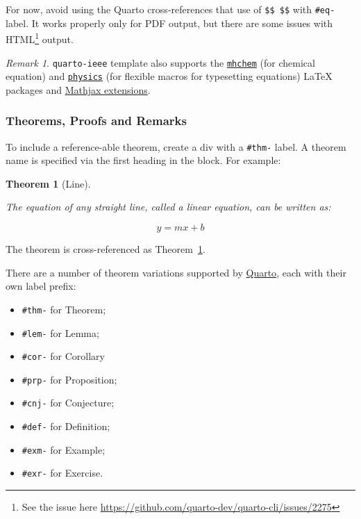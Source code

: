 \documentclass[
  journal,
]{IEEEtran}%
\providecommand{\tightlist}{%
  \setlength{\itemsep}{0pt}\setlength{\parskip}{0pt}}\usepackage{longtable,booktabs,array}
\theoremstyle{plain}
\newtheorem{theorem}{Theorem}[section]
\theoremstyle{remark}
\newtheorem*{remark}{Remark}
\begin{document}
For now, avoid using the Quarto cross-references that use of
\texttt{\$\$\ \$\$} with \texttt{\#eq-} label. It works properly only
for PDF output, but there are some issues with HTML\footnote{See the
  issue here \url{https://github.com/quarto-dev/quarto-cli/issues/2275}}
output.

\begin{remark}

\texttt{quarto-ieee} template also supports the
\href{https://ctan.org/pkg/mhchem}{\texttt{mhchem}} (for chemical
equation) and \href{https://ctan.org/pkg/physics}{\texttt{physics}} (for
flexible macros for typesetting equations) {\LaTeX} packages and
\href{https://docs.mathjax.org/en/latest/input/tex/extensions/index.html}{Mathjax
extensions}.

\end{remark}

\hypertarget{theorems-proofs-and-remarks}{%
\subsubsection{Theorems, Proofs and
Remarks}\label{theorems-proofs-and-remarks}}

To include a reference-able theorem, create a div with a \texttt{\#thm-}
label. A theorem name is specified via the first heading in the block.
For example:

\begin{theorem}[Line]\protect\hypertarget{thm-line}{}\label{thm-line}

The equation of any straight line, called a linear equation, can be
written as:

\[
y = mx + b
\]

\end{theorem}

The theorem is cross-referenced as Theorem~\ref{thm-line}.

There are a number of theorem variations supported by
\href{https://quarto.org/docs/authoring/cross-references.html\#theorems-and-proofs}{Quarto},
each with their own label prefix:

\begin{itemize}
\tightlist
\item
  \texttt{\#thm-} for Theorem;
\item
  \texttt{\#lem-} for Lemma;
\item
  \texttt{\#cor-} for Corollary
\item
  \texttt{\#prp-} for Proposition;
\item
  \texttt{\#cnj-} for Conjecture;
\item
  \texttt{\#def-} for Definition;
\item
  \texttt{\#exm-} for Example;
\item
  \texttt{\#exr-} for Exercise.
\end{itemize}
\end{document}
